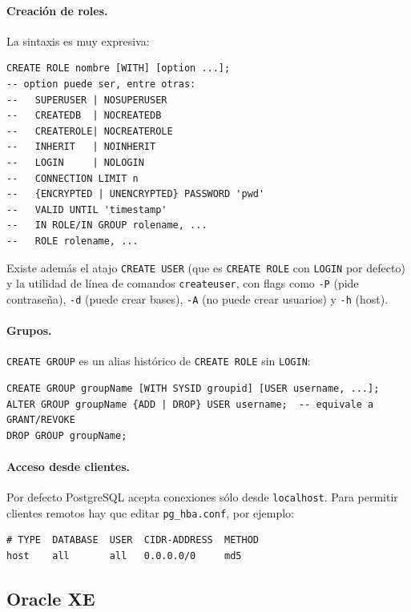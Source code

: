 \documentclass[11pt,a4paper]{article}
\begin{document}
\paragraph{Creación de roles.} La sintaxis es muy expresiva:

\begin{lstlisting}
CREATE ROLE nombre [WITH] [option ...];
-- option puede ser, entre otras:
--   SUPERUSER | NOSUPERUSER
--   CREATEDB  | NOCREATEDB
--   CREATEROLE| NOCREATEROLE
--   INHERIT   | NOINHERIT
--   LOGIN     | NOLOGIN
--   CONNECTION LIMIT n
--   {ENCRYPTED | UNENCRYPTED} PASSWORD 'pwd'
--   VALID UNTIL 'timestamp'
--   IN ROLE/IN GROUP rolename, ...
--   ROLE rolename, ...
\end{lstlisting}

Existe además el atajo \texttt{CREATE USER} (que es \texttt{CREATE ROLE}
con \texttt{LOGIN} por defecto) y la utilidad de línea de comandos
\texttt{createuser}, con flags como \texttt{-P} (pide contraseña),
\texttt{-d} (puede crear bases), \texttt{-A} (no puede crear
usuarios) y \texttt{-h} (host).

\paragraph{Grupos.} \texttt{CREATE GROUP} es un alias histórico de
\texttt{CREATE ROLE} sin \texttt{LOGIN}:

\begin{lstlisting}
CREATE GROUP groupName [WITH SYSID groupid] [USER username, ...];
ALTER GROUP groupName {ADD | DROP} USER username;  -- equivale a GRANT/REVOKE
DROP GROUP groupName;
\end{lstlisting}

\paragraph{Acceso desde clientes.} Por defecto PostgreSQL acepta
conexiones sólo desde \texttt{localhost}. Para permitir clientes
remotos hay que editar \texttt{pg\_hba.conf}, por ejemplo:

\begin{lstlisting}
# TYPE  DATABASE  USER  CIDR-ADDRESS  METHOD
host    all       all   0.0.0.0/0     md5
\end{lstlisting}

\subsection{Oracle XE}
\end{document}
